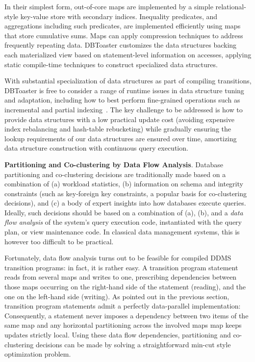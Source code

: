 In their simplest form, out-of-core maps are implemented by a simple
relational-style key-value store with secondary indices\cite{berkeleydb}.
Inequality predicates, and aggregations including such predicates, are
implemented efficiently using maps that store cumulative
sums\cite{rangequeries}.  Maps can apply compression techniques to address
frequently repeating data.
DBToaster customizes the data structures backing each materialized view based
on statement-level information on accesses, applying static compile-time
techniques to construct specialized data structures.

With substantial specialization of data structures as part of compiling
transitions, DBToaster is free to consider a range of runtime issues in data
structure tuning and adaptation, including how to best perform fine-grained
operations such as incremental and partial
indexing~\cite{stonebreaker-sigrec:89}. The key challenge to be addressed is how
to provide data structures with a low practical update cost (avoiding expensive
index rebalancing and hash-table rebucketing) while gradually ensuring the
lookup requirements of our data structures are ensured over time, amortizing data
structure construction with continuous query execution.


\noindent
{\bf Partitioning and Co-clustering by Data Flow Analysis}.
%
Database partitioning and co-clustering decisions
are traditionally made based on a combination of
(a) workload statistics, (b) information on schema and integrity constraints
(such as key-foreign key constraints, a popular basis for co-clustering
decisions), and (c) a body of expert insights into how databases execute
queries. Ideally, such decisions should be based on a combination
of (a), (b), and a {\em data flow analysis}\/ of the system's query execution code,
instantiated with the query plan, or view maintenance code. In classical
data management systems, this is however too difficult to be practical.

Fortunately, data flow analysis turns out to be
feasible for compiled DDMS transition programs: in fact, it is rather easy.
A transition program statement reads from several maps and writes to one,
prescribing dependencies between those maps occurring on the right-hand side of the statement (reading), and the one on the left-hand side (writing).
As pointed out in the previous section, transition program statements
admit a perfectly data-parallel implementation: Consequently,
a statement never imposes a dependency between two items of the same map
and any horizontal partitioning across the involved maps
map keeps updates strictly local.
%
Using these data flow dependencies, partitioning and co-clustering
decisions can be made by
solving a straightforward min-cut style optimization problem.



